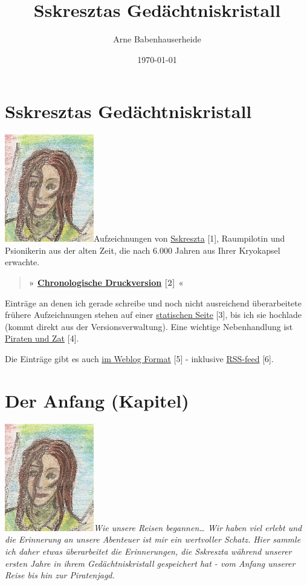 \documentclass[11pt]{scrartcl}
\title{Sskresztas Gedächtniskristall}
\author{Arne Babenhauserheide}
\date{\today}
\begin{document}
\maketitle

\section{Sskresztas Gedächtniskristall}

\includegraphics{sskreszta-portrait-alt-klein.png}Aufzeichnungen
von
\href{http://1w6.org/deutsch/kampagnen/w-chter-der-zeit/charaktere/sskreszta}{Sskreszta}
{[}1{]}, Raumpilotin und Psionikerin aus der alten Zeit, die nach 6.000
Jahren aus Ihrer Kryokapsel erwachte.

\begin{quote}
\textbf{» \href{http://1w6.org/print/book/export/html/59}{Chronologische
Druckversion} {[}2{]} «}

\end{quote}
Einträge an denen ich gerade schreibe und noch nicht ausreichend
überarbeitete frühere Aufzeichnungen stehen auf einer
\href{http://1w6.org/rpg\_logs/sskreszta/index.html}{statischen Seite}
{[}3{]}, bis ich sie hochlade (kommt direkt aus der Versionsverwaltung).
Eine wichtige Nebenhandlung ist
\href{http://1w6.org/deutsch/welten/raumzeit/geschichten/piraten-und-zerg}{Piraten
und Zat} {[}4{]}.

Die Einträge gibt es auch
\href{http://1w6.org/stichwort/sskreszta-log}{im Weblog Format} {[}5{]}
- inklusive \href{http://1w6.org/stichwort/sskreszta-log/feed}{RSS-feed}
{[}6{]}.

\section{Der Anfang (Kapitel)}

\includegraphics{sskreszta-portrait-alt-klein.png}\emph{Wie
unsere Reisen begannen\ldots{} Wir haben viel erlebt und die Erinnerung
an unsere Abenteuer ist mir ein wertvoller Schatz. Hier sammle ich daher
etwas überarbeitet die Erinnerungen, die Sskreszta während unserer
ersten Jahre in ihrem Gedächtniskristall gespeichert hat - vom Anfang
unserer Reise bis hin zur Piratenjagd.}
\end{document}
